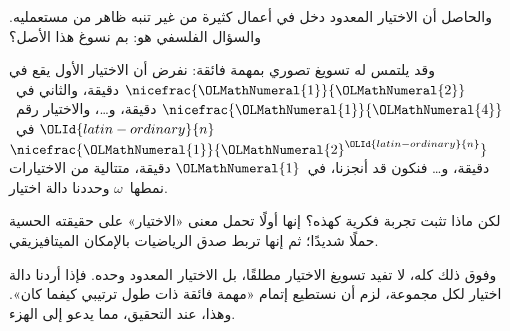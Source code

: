 \documentclass[../../../include/open-logic-section]{subfiles}
\begin{document}
والحاصل أن الاختيار المعدود دخل في أعمال كثيرة من غير تنبه ظاهر من
مستعمليه. والسؤال الفلسفي هو: بم نسوغ هذا الأصل؟

وقد يلتمس له تسويغ تصوري بمهمة فائقة: نفرض أن الاختيار الأول يقع في
$\nicefrac{\OLMathNumeral{1}}{\OLMathNumeral{2}}$ دقيقة، والثاني في~$\nicefrac{\OLMathNumeral{1}}{\OLMathNumeral{4}}$ دقيقة،
و\dots، والاختيار رقم~$\OLId{latin-ordinary}{n}$ في~$\nicefrac{\OLMathNumeral{1}}{\OLMathNumeral{2}^\OLId{latin-ordinary}{n}}$ دقيقة، و\dots\@
فنكون قد أنجزنا، في~$\OLMathNumeral{1}$ دقيقة، متتالية من الاختيارات نمطها~$\omega$
وحددنا دالة اختيار.

لكن ماذا تثبت تجربة فكرية كهذه؟ إنها أولًا تحمل معنى «الاختيار» على
حقيقته الحسية حملًا شديدًا؛ ثم إنها تربط صدق الرياضيات بالإمكان
الميتافيزيقي.

وفوق ذلك كله، لا تفيد تسويغ الاختيار مطلقًا، بل الاختيار المعدود وحده.
فإذا أردنا دالة اختيار لكل مجموعة، لزم أن نستطيع إتمام «مهمة فائقة ذات
طول ترتيبي كيفما كان». وهذا، عند التحقيق، مما يدعو إلى الهزء.
\end{document}
